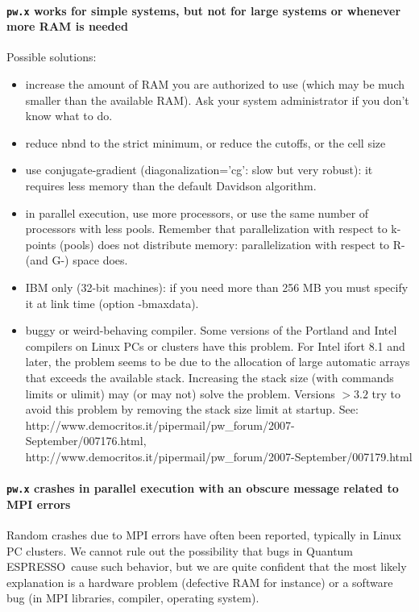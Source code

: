 \documentclass[12pt,a4paper]{article}
\def\qe{{\sc Quantum ESPRESSO}}
\def\pw.x{\texttt{pw.x}}
\begin{document}
\paragraph{\pw.x works for simple systems, but not for large systems
  or whenever more RAM is needed}  
Possible solutions:
\begin{itemize}
\item increase the amount of RAM you are authorized to use (which may
  be much smaller than the available RAM). Ask your system
  administrator if you don't know what to do.  
\item reduce nbnd to the strict minimum, or reduce the cutoffs, or the
  cell size 
\item  use conjugate-gradient (diagonalization='cg': slow but very
  robust): it requires less memory than the default Davidson
  algorithm. 
\item in parallel execution, use more processors, or use the same
  number of processors with less pools. Remember that parallelization
  with respect to k-points (pools) does not distribute memory:
  parallelization with respect to R- (and G-) space does. 
\item IBM only (32-bit machines): if you need more than 256 MB you
  must specify it at link time (option -bmaxdata). 
\item buggy or weird-behaving compiler. Some versions of the Portland
  and Intel compilers on Linux PCs or clusters have this problem. For
  Intel ifort 8.1 and later, the problem seems to be due to the
  allocation of large automatic arrays that exceeds the available
  stack. Increasing the stack size (with commands limits or ulimit)
  may (or may not) solve the problem. Versions $> 3.2$ try to avoid this
  problem by removing the stack size limit at startup. See:\\
  http://www.democritos.it/pipermail/pw\_forum/2007-September/007176.html,\\
  http://www.democritos.it/pipermail/pw\_forum/2007-September/007179.html 
\end{itemize}

\paragraph{\pw.x crashes in parallel execution with an obscure message
  related to MPI errors} 
Random crashes due to MPI errors have often been reported, typically
in Linux PC clusters. We cannot rule out the possibility that bugs in
\qe\ cause such behavior, but we are quite confident that
the most likely explanation is a hardware problem (defective RAM  
for instance) or a software bug (in MPI libraries, compiler, operating
system). 
\end{document}
